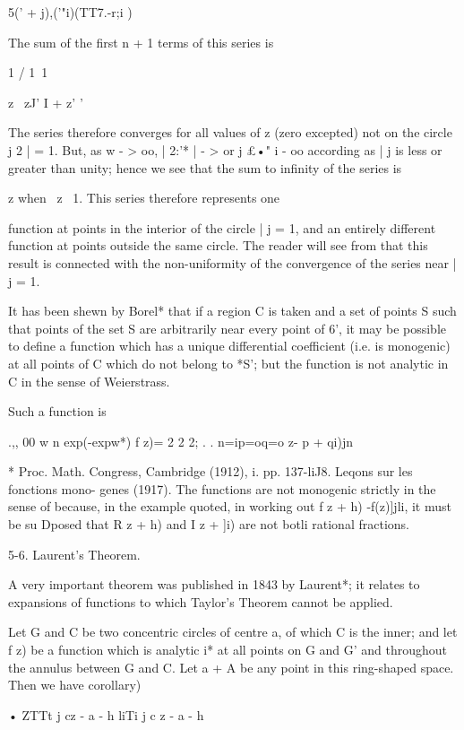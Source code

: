{{5(' + j)\!,('"i)(TT7.-r;i )

The sum of the first n + 1 terms of this series is

1 / 1\ 1

z \ zJ' I + z' '

The series therefore converges for all values of z (zero excepted) not
on the circle j 2 | = 1. But, as w - > oo, | 2:'* | - > or j £•" i -
oo according as | j is less or greater than unity; hence we see that
the sum to infinity of the series is

z when \ z\ < 1, and - when | j > 1. This series therefore represents
one

function at points in the interior of the circle | j = 1, and an
entirely different function at points outside the same circle. The
reader will see from that this result is connected with the
non-uniformity of the convergence of the series near | j = 1.

It has been shewn by Borel* that if a region C is taken and a set of
points S such that points of the set S are arbitrarily near every
point of 6', it may be possible to define a function which has a
unique differential coefficient (i.e. is monogenic) at all points of C
which do not belong to *S'; but the function is not analytic in C in
the sense of Weierstrass.

Such a function is

.,, 00 w n exp(-expw*) f z)= 2 2 2; . . n=ip=oq=o z- p + qi)jn

* Proc. Math. Congress, Cambridge (1912), i. pp. 137-liJ8. Leqons sur
les fonctions mono- genes (1917). The functions are not monogenic
strictly in the sense of because, in the example quoted, in
working out f z + h) -f(z)]jli, it must be su Dposed that R z + h) and
I z + ]i) are not botli rational fractions.

%
%

5-6. Laurent's Theorem.

A very important theorem was published in 1843 by Laurent*; it
relates to expansions of functions to which Taylor's Theorem cannot be
applied.

Let G and C be two concentric circles of centre a, of which C is the
inner; and let f z) be a function which is analytic i* at all points
on G and G' and throughout the annulus between G and C. Let a + A be
any point in this ring-shaped space. Then we have  corollary)

• ZTTt j cz - a - h liTi j c z - a - h

}}
